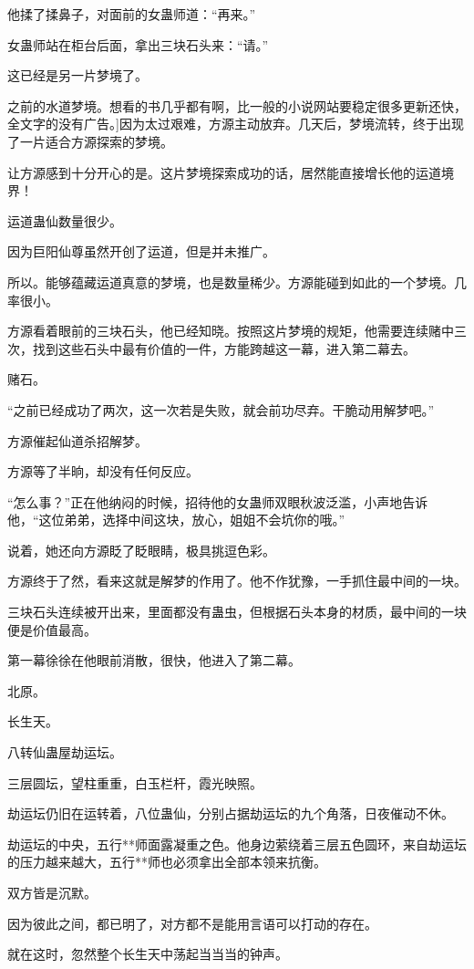 \begin{this_body}
他揉了揉鼻子，对面前的女蛊师道：“再来。”

女蛊师站在柜台后面，拿出三块石头来：“请。”

这已经是另一片梦境了。

之前的水道梦境。想看的书几乎都有啊，比一般的小说网站要稳定很多更新还快，全文字的没有广告。]因为太过艰难，方源主动放弃。几天后，梦境流转，终于出现了一片适合方源探索的梦境。

让方源感到十分开心的是。这片梦境探索成功的话，居然能直接增长他的运道境界！

运道蛊仙数量很少。

因为巨阳仙尊虽然开创了运道，但是并未推广。

所以。能够蕴藏运道真意的梦境，也是数量稀少。方源能碰到如此的一个梦境。几率很小。

方源看着眼前的三块石头，他已经知晓。按照这片梦境的规矩，他需要连续赌中三次，找到这些石头中最有价值的一件，方能跨越这一幕，进入第二幕去。

赌石。

“之前已经成功了两次，这一次若是失败，就会前功尽弃。干脆动用解梦吧。”

方源催起仙道杀招解梦。

方源等了半晌，却没有任何反应。

“怎么事？”正在他纳闷的时候，招待他的女蛊师双眼秋波泛滥，小声地告诉他，“这位弟弟，选择中间这块，放心，姐姐不会坑你的哦。”

说着，她还向方源眨了眨眼睛，极具挑逗色彩。

方源终于了然，看来这就是解梦的作用了。他不作犹豫，一手抓住最中间的一块。

三块石头连续被开出来，里面都没有蛊虫，但根据石头本身的材质，最中间的一块便是价值最高。

第一幕徐徐在他眼前消散，很快，他进入了第二幕。

北原。

长生天。

八转仙蛊屋劫运坛。

三层圆坛，望柱重重，白玉栏杆，霞光映照。

劫运坛仍旧在运转着，八位蛊仙，分别占据劫运坛的九个角落，日夜催动不休。

劫运坛的中央，五行**师面露凝重之色。他身边萦绕着三层五色圆环，来自劫运坛的压力越来越大，五行**师也必须拿出全部本领来抗衡。

双方皆是沉默。

因为彼此之间，都已明了，对方都不是能用言语可以打动的存在。

就在这时，忽然整个长生天中荡起当当当的钟声。


\end{this_body}
